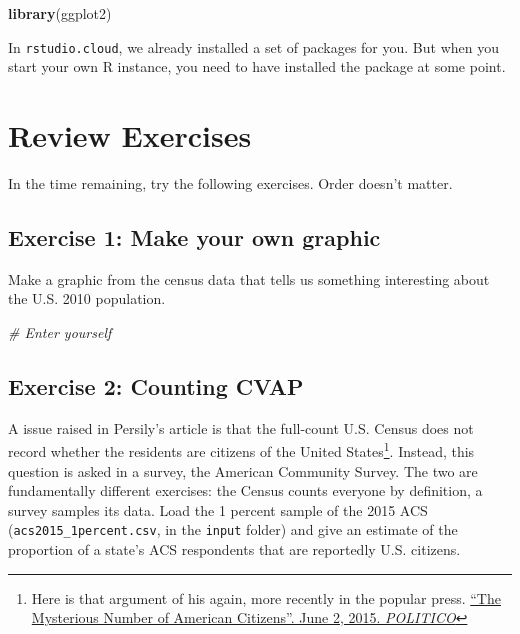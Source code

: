 \documentclass[]{book}
\newenvironment{Shaded}{\begin{snugshade}}{\end{snugshade}}
\newcommand{\KeywordTok}[1]{\textcolor[rgb]{0.13,0.29,0.53}{\textbf{#1}}}
\newcommand{\CommentTok}[1]{\textcolor[rgb]{0.56,0.35,0.01}{\textit{#1}}}
\newcommand{\NormalTok}[1]{#1}
\let\rmarkdownfootnote\footnote%
\def\footnote{\protect\rmarkdownfootnote}
\theoremstyle{definition}
\theoremstyle{definition}
\theoremstyle{definition}
\theoremstyle{remark}
\begin{document}
\begin{Shaded}
\begin{Highlighting}[]
\KeywordTok{library}\NormalTok{(ggplot2)}
\end{Highlighting}
\end{Shaded}

In \texttt{rstudio.cloud}, we already installed a set of packages for
you. But when you start your own R instance, you need to have installed
the package at some point.

\section{Review Exercises}\label{review-exercises}

In the time remaining, try the following exercises. Order doesn't
matter.

\subsection{Exercise 1: Make your own
graphic}\label{exercise-1-make-your-own-graphic}

Make a graphic from the census data that tells us something interesting
about the U.S. 2010 population.

\begin{Shaded}
\begin{Highlighting}[]
\CommentTok{# Enter yourself}
\end{Highlighting}
\end{Shaded}

\subsection{Exercise 2: Counting CVAP}\label{exercise-2-counting-cvap}

A issue raised in Persily's article is that the full-count U.S. Census
does not record whether the residents are citizens of the United
States\footnote{Here is that argument of his again, more recently in the
  popular press.
  \href{http://www.politico.com/magazine/story/2015/06/the-supreme-courts-big-data-problem-118568}{``The
  Mysterious Number of American Citizens''. June 2, 2015.
  \emph{POLITICO}}}. Instead, this question is asked in a survey, the
American Community Survey. The two are fundamentally different
exercises: the Census counts everyone by definition, a survey samples
its data. Load the 1 percent sample of the 2015 ACS
(\texttt{acs2015\_1percent.csv}, in the \texttt{input} folder) and give
an estimate of the proportion of a state's ACS respondents that are
reportedly U.S. citizens.
\end{document}
